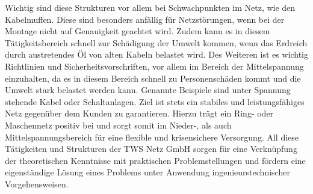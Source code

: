 Wichtig sind diese Strukturen vor allem bei Schwachpunkten im Netz, wie \zB den Kabelmuffen. Diese sind besonders anfällig für Netzstörungen, wenn bei 
der Montage nicht auf Genauigkeit geachtet wird. Zudem kann es in diesem Tätigkeitsbereich schnell zur Schädigung der Umwelt kommen, wenn das Erdreich 
durch austretendes Öl von alten Kabeln belastet wird. Des Weiteren ist es wichtig Richtlinien und Sicherheitsvorschriften, vor allem im Bereich der 
Mittelspannung einzuhalten, da es in diesem Bereich schnell zu Personenschäden kommt und die Umwelt stark belastet werden kann. Genannte Beispiele sind 
unter Spannung stehende Kabel oder  Schaltanlagen. Ziel ist stets ein stabiles und leistungsfähiges Netz gegenüber dem Kunden zu garantieren. Hierzu 
trägt ein Ring- oder Maschennetz positiv bei und sorgt somit im Nieder-, als auch Mittelspannungsbereich für eine flexible und krisensichere Versorgung. 
All diese Tätigkeiten und Strukturen der TWS Netz GmbH sorgen für eine Verknüpfung der theoretischen Kenntnisse mit praktischen Problemstellungen und 
fördern eine eigenständige Lösung eines Problems unter Anwendung ingenieurstechnischer Vorgehensweisen.